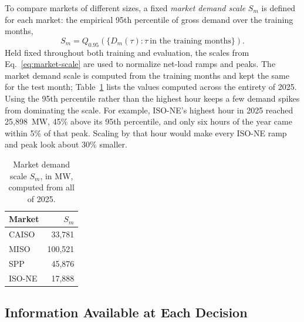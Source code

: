 \documentclass{UNCC-thesis}
\begin{document}
To compare markets of different sizes, a fixed \emph{market demand scale}
\(S_m\) is defined for each market: the empirical 95th percentile of gross
demand over the training months,
\begin{equation}
  S_m
  =
  Q_{0.95}\!\left(\{D_m(\tau):\tau\ \text{in the training months}\}\right).
  \label{eq:market-scale}
\end{equation}
Held fixed throughout both training and evaluation, the scales from
Eq.~\eqref{eq:market-scale} are used to normalize net-load ramps and peaks. The market demand
scale is computed from the training months and kept the same for the test month;
Table~\ref{tab:frozen-stats} lists the values computed across the entirety of 2025.
Using the 95th percentile rather than the highest hour keeps a few demand
spikes from dominating the scale. For example, ISO-NE's highest hour in 2025
reached 25,898~MW, 45\% above its 95th percentile, and only six hours of the
year came within 5\% of that peak. Scaling by that hour would make every
ISO-NE ramp and peak look about 30\% smaller.

\begin{table}[tbp]
  \centering
  \footnotesize
  \caption[Market demand scale of each market]{Market demand scale \(S_m\), in MW, computed from all of 2025.}
  \label{tab:frozen-stats}
  \begin{tabular}{@{}lr@{}}
    \toprule
    Market & \(S_m\) \\
    \midrule
    CAISO          & 33,781 \\
    MISO           & 100,521 \\
    SPP            & 45,876 \\
    ISO-NE         & 17,888 \\
    \bottomrule
  \end{tabular}
\end{table}

\subsection{Information Available at Each Decision}
\label{subsec:problem-causality}
\end{document}
